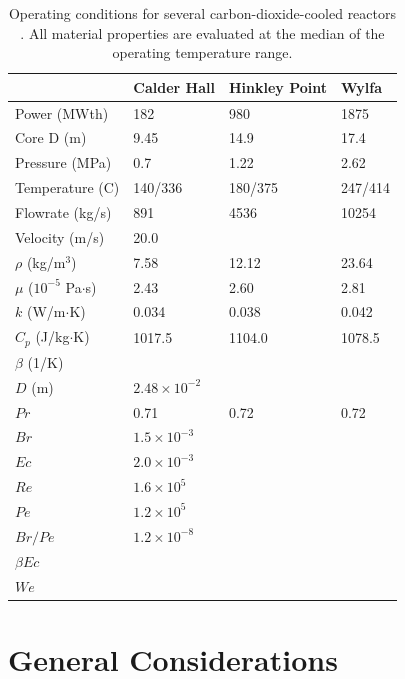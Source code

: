 \documentclass[10pt]{article}
\numberwithin{equation}{section} %
\begin{document}
\begin{table}[H]
\caption{Operating conditions for several carbon-dioxide-cooled reactors \cite{MAGNOX}. All material properties are evaluated at the median of the operating temperature range.} %
\centering
\begin{tabular}{l l l l}
\hline\hline
 & Calder Hall & Hinkley Point & Wylfa\\ [0.5ex]
\hline
 Power (MWth)						& 182				& 980				& 1875\\
 Core D (m)						& 9.45				& 14.9				& 17.4\\
 Pressure (MPa)					& 0.7					& 1.22				& 2.62\\
 Temperature (C)					& 140/336				& 180/375				& 247/414\\
 Flowrate (kg/s)						& 891				& 4536				& 10254\\
 Velocity (m/s)						& 20.0				& 					& \\
 \(\rho\) (kg/\(\textrm{m}^3\))			& 7.58				& 12.12				& 23.64\\
 \(\mu\) (\(10^{-5}\) Pa\(\cdot\)s)			& 2.43				& 2.60				& 2.81\\
 \(k\) (W/m\(\cdot\)K)					& 0.034				& 0.038				& 0.042\\
 \(C_p\) (J/kg\(\cdot\)K)				& 1017.5				& 1104.0				& 1078.5\\
 \(\beta\) (1/K)						& & &\\
 \(D\) (m)							& \(2.48\times10^{-2}\)	&					& \\
 \(Pr\)							& 0.71				& 0.72				& 0.72\\
 \(Br\)							& \(1.5\times10^{-3}\)	& & \\
 \(Ec\)							& \(2.0\times10^{-3}\)	& & \\
 \(Re\)							& \(1.6\times10^5\)		& 					& \\
 \(Pe\)							& \(1.2\times10^5\)		& 					&\\
 \(Br/Pe\)							& \(1.2\times10^{-8}\)	& & \\
 \(\beta Ec\)						& & & \\
 \(We\)							& & & \\
\hline
\end{tabular}
\label{table:CO2Reactors}
\end{table}

\section{General Considerations}
\end{document}
